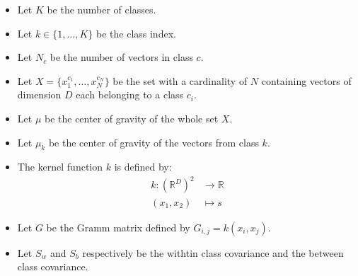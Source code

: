 
\begin{itemize}
  \item Let $K$ be the number of classes.
  \item Let $k \in \{1, \ldots, K\}$ be the class index. 
  \item Let $N_c$ be the number of vectors in class $c$.
  \item Let $X = \{x^{c_1}_1, \ldots, x^{c_N}_N\}$ be the set with a cardinality of $N$ containing vectors of dimension $D$ each belonging to a class $c_i$.
  \item Let $\mu$ be the center of gravity of the whole set $X$.
  \item Let $\mu_k$ be the center of gravity of the vectors from class $k$.
  \item The kernel function $k$ is defined by:
  	\begin{align*}
   		k : \left(\mathbb{R}^D\right)^2 &\to \mathbb{R}\\
   		(x_1, x_2) &\mapsto s 
   	\end{align*}
  \item Let $G$ be the Gramm matrix defined by $G_{i,j} = k(x_i, x_j)$.
  \item Let $S_w$ and $S_b$ respectively be the withtin class covariance and the between class covariance. 
\end{itemize}
